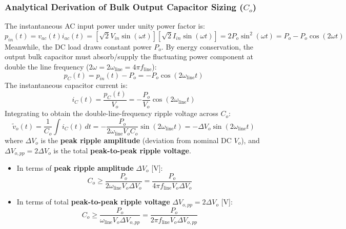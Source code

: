 \subsubsection{Analytical Derivation of Bulk Output Capacitor Sizing ($C_o$)}
The instantaneous AC input power under unity power factor is:
\begin{equation}
p_{in}(t) = v_{ac}(t) i_{ac}(t) = \left[\sqrt{2} V_{in}\sin(\omega t)\right]\left[\sqrt{2} I_{in}\sin(\omega t)\right] = 2 P_o \sin^2(\omega t) = P_o - P_o \cos(2\omega t)
\end{equation}
Meanwhile, the DC load draws constant power $P_o$. By energy conservation, the output bulk capacitor must absorb/supply the fluctuating power component at double the line frequency ($2\omega = 2\omega_{\mathrm{line}} = 4\pi f_{\mathrm{line}}$):
\begin{equation}
p_C(t) = p_{in}(t) - P_o = -P_o \cos(2\omega_{\mathrm{line}} t)
\end{equation}
The instantaneous capacitor current is:
\begin{equation}
i_C(t) = \frac{p_C(t)}{V_o} = -\frac{P_o}{V_o}\cos(2\omega_{\mathrm{line}} t)
\end{equation}
Integrating to obtain the double-line-frequency ripple voltage across $C_o$:
\begin{equation}
\tilde{v}_o(t) = \frac{1}{C_o}\int i_C(t)\,dt = -\frac{P_o}{2\omega_{\mathrm{line}} V_o C_o}\sin(2\omega_{\mathrm{line}} t) = -\Delta V_o \sin(2\omega_{\mathrm{line}} t)
\end{equation}
where $\Delta V_o$ is the \textbf{peak ripple amplitude} (deviation from nominal DC $V_o$), and $\Delta V_{o,pp} = 2\Delta V_o$ is the total \textbf{peak-to-peak ripple voltage}.
\begin{itemize}
  \item In terms of \textbf{peak ripple amplitude} $\Delta V_o$ [V]:
  \begin{equation}
  \label{eq:pfc_Co_sizing}
  C_o \ge \frac{P_o}{2\omega_{\mathrm{line}} V_o \Delta V_o} = \frac{P_o}{4\pi f_{\mathrm{line}} V_o \Delta V_o}
  \end{equation}
  \item In terms of total \textbf{peak-to-peak ripple voltage} $\Delta V_{o,pp} = 2\Delta V_o$ [V]:
  \begin{equation}
  \label{eq:pfc_Co_sizing_pp}
  C_o \ge \frac{P_o}{\omega_{\mathrm{line}} V_o \Delta V_{o,pp}} = \frac{P_o}{2\pi f_{\mathrm{line}} V_o \Delta V_{o,pp}}
  \end{equation}
\end{itemize}
